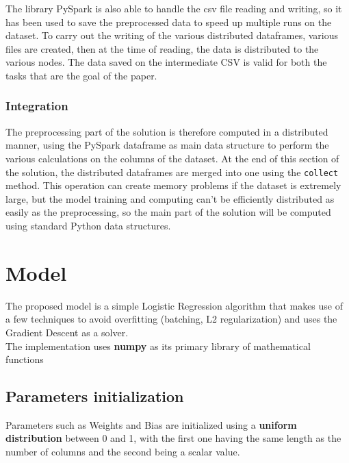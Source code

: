 \documentclass[
	letterpaper, %
	10pt, %
]{class}
\begin{document}
The library PySpark is also able to handle the csv file reading and writing, so it has been used to save the preprocessed data to speed up multiple runs on the dataset. To carry out the writing of the various distributed dataframes, various files are created, then at the time of reading, the data is distributed to the various nodes. The data saved on the intermediate CSV is valid for both the tasks that are the goal of the paper.\\

\subsubsection{Integration}

The preprocessing part of the solution is therefore computed in a distributed manner, using the PySpark dataframe as main data structure to perform the various calculations on the columns of the dataset.
At the end of this section of the solution, the distributed dataframes are merged into one using the \texttt{collect} method. This operation can create memory problems if the dataset is extremely large, but the model training and computing can't be efficiently distributed
as easily as the preprocessing, so the main part of the solution will be computed using standard Python data structures.


\section{Model}

The proposed model is a simple Logistic Regression \cite{logistic} algorithm that makes use of a few techniques to avoid overfitting (batching, L2 regularization) and uses the Gradient Descent as a solver.\\
The implementation uses \textbf{numpy} \cite{numpy} as its primary library of mathematical functions

\subsection{Parameters initialization}
Parameters such as Weights and Bias are initialized using a \textbf{uniform distribution} between 0 and 1, with the first one having the same length as the number of columns and the second being a scalar value.
\end{document}
